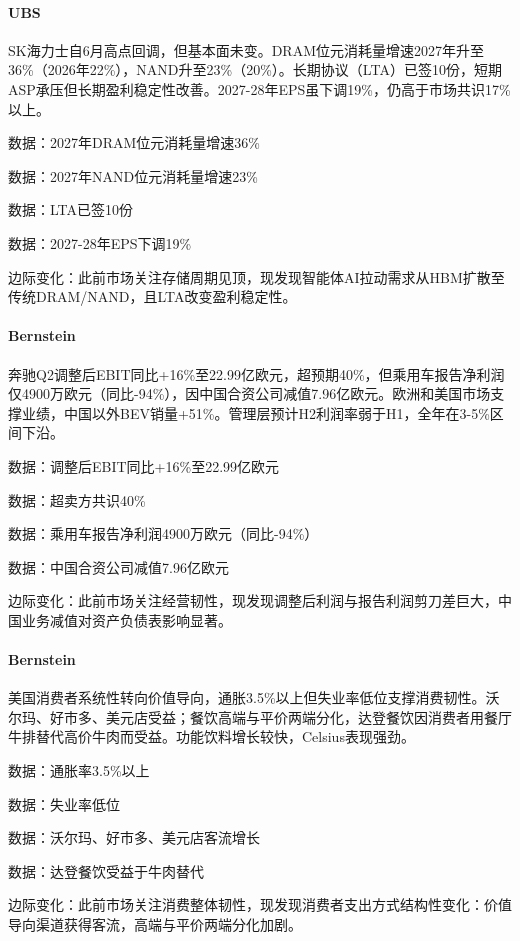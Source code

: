 \documentclass[11pt]{ctexart}
\begin{document}
\paragraph{UBS} SK海力士自6月高点回调，但基本面未变。DRAM位元消耗量增速2027年升至36\%（2026年22\%），NAND升至23\%（20\%）。长期协议（LTA）已签10份，短期ASP承压但长期盈利稳定性改善。2027-28年EPS虽下调19\%，仍高于市场共识17\%以上。
{\small\color{refgray}数据：2027年DRAM位元消耗量增速36\%\par}
{\small\color{refgray}数据：2027年NAND位元消耗量增速23\%\par}
{\small\color{refgray}数据：LTA已签10份\par}
{\small\color{refgray}数据：2027-28年EPS下调19\%\par}
{\small\color{refgray}边际变化：此前市场关注存储周期见顶，现发现智能体AI拉动需求从HBM扩散至传统DRAM/NAND，且LTA改变盈利稳定性。\par}
\paragraph{Bernstein} 奔驰Q2调整后EBIT同比+16\%至22.99亿欧元，超预期40\%，但乘用车报告净利润仅4900万欧元（同比-94\%），因中国合资公司减值7.96亿欧元。欧洲和美国市场支撑业绩，中国以外BEV销量+51\%。管理层预计H2利润率弱于H1，全年在3-5\%区间下沿。
{\small\color{refgray}数据：调整后EBIT同比+16\%至22.99亿欧元\par}
{\small\color{refgray}数据：超卖方共识40\%\par}
{\small\color{refgray}数据：乘用车报告净利润4900万欧元（同比-94\%）\par}
{\small\color{refgray}数据：中国合资公司减值7.96亿欧元\par}
{\small\color{refgray}边际变化：此前市场关注经营韧性，现发现调整后利润与报告利润剪刀差巨大，中国业务减值对资产负债表影响显著。\par}
\paragraph{Bernstein} 美国消费者系统性转向价值导向，通胀3.5\%以上但失业率低位支撑消费韧性。沃尔玛、好市多、美元店受益；餐饮高端与平价两端分化，达登餐饮因消费者用餐厅牛排替代高价牛肉而受益。功能饮料增长较快，Celsius表现强劲。
{\small\color{refgray}数据：通胀率3.5\%以上\par}
{\small\color{refgray}数据：失业率低位\par}
{\small\color{refgray}数据：沃尔玛、好市多、美元店客流增长\par}
{\small\color{refgray}数据：达登餐饮受益于牛肉替代\par}
{\small\color{refgray}边际变化：此前市场关注消费整体韧性，现发现消费者支出方式结构性变化：价值导向渠道获得客流，高端与平价两端分化加剧。\par}
\end{document}
